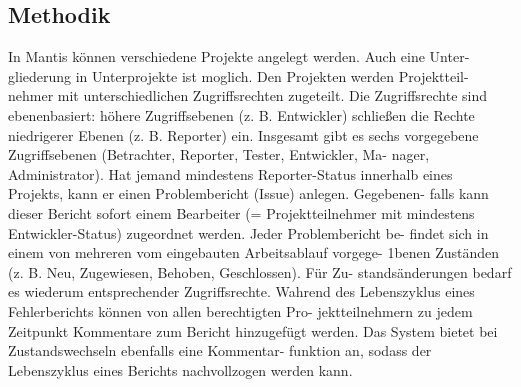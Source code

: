 \subsection{Methodik}
In Mantis können verschiedene Projekte angelegt werden. Auch eine Unter-
gliederung in Unterprojekte ist moglich. Den Projekten werden Projektteil-
nehmer mit unterschiedlichen Zugriffsrechten zugeteilt. Die Zugriffsrechte
sind ebenenbasiert: höhere Zugriffsebenen (z. B. Entwickler) schließen die
Rechte niedrigerer Ebenen (z. B. Reporter) ein. Insgesamt gibt es sechs
vorgegebene Zugriffsebenen (Betrachter, Reporter, Tester, Entwickler, Ma-
nager, Administrator). Hat jemand mindestens Reporter-Status innerhalb
eines Projekts, kann er einen Problembericht (Issue) anlegen. Gegebenen-
falls kann dieser Bericht sofort einem Bearbeiter (= Projektteilnehmer mit
mindestens Entwickler-Status) zugeordnet werden. Jeder Problembericht be-
findet sich in einem von mehreren vom eingebauten Arbeitsablauf vorgege-
1benen Zuständen (z. B. Neu, Zugewiesen, Behoben, Geschlossen). Für Zu-
standsänderungen bedarf es wiederum entsprechender Zugriffsrechte. Wahrend
des Lebenszyklus eines Fehlerberichts können von allen berechtigten Pro-
jektteilnehmern zu jedem Zeitpunkt Kommentare zum Bericht hinzugefügt
werden. Das System bietet bei Zustandswechseln ebenfalls eine Kommentar-
funktion an, sodass der Lebenszyklus eines Berichts nachvollzogen werden
kann.



